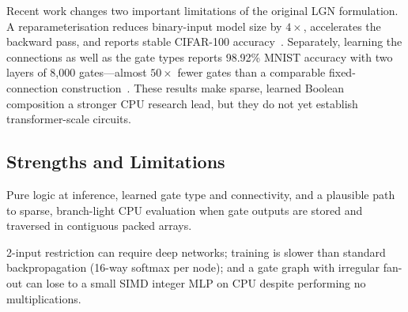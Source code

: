 Recent work changes two important limitations of the original LGN
formulation. A reparameterisation reduces binary-input model size by
$4\times$, accelerates the backward pass, and reports stable CIFAR-100
accuracy~\cite{ruttgers2025light}. Separately, learning the connections as
well as the gate types reports 98.92\% MNIST accuracy with two layers of
8{,}000 gates---almost $50\times$ fewer gates than a comparable
fixed-connection construction~\cite{mommen2026fullytrainable}. These
results make sparse, learned Boolean composition a stronger CPU research
lead, but they do not yet establish transformer-scale circuits.

\subsection{Strengths and Limitations}

\begin{description}[leftmargin=1em]
  \item[Strengths:]
    Pure logic at inference, learned gate type and connectivity, and a
    plausible path to sparse, branch-light CPU evaluation when gate outputs
    are stored and traversed in contiguous packed arrays.

  \item[Limitations:]
    2-input restriction can require deep networks; training is slower than
    standard backpropagation (16-way softmax per node); and a gate graph
    with irregular fan-out can lose to a small SIMD integer MLP on CPU
    despite performing no multiplications.
\end{description}
